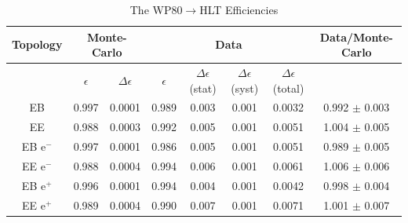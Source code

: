 \begin{table}
  \begin{center}
    \caption{The WP80$\to$HLT Efficiencies}
    \label{tab:wp80HltResults}
    \vskip 2mm
    \begin{tabular}{c|cc|cccc|c}\hline \hline
      Topology &   \multicolumn{2}{c|}{Monte-Carlo} & \multicolumn{4}{c|}{Data} & Data/Monte-Carlo  \\ \hline
               &   $\epsilon$ &  $\Delta\epsilon$  & $\epsilon$ & $\Delta\epsilon$ (stat) & $\Delta\epsilon$ (syst) & $\Delta\epsilon$ (total) &  \\ \hline
      EB       &   0.997     & 0.0001             & 0.989     & 0.003                  & 0.001                  & 0.0032                   & 0.992 $\pm$ 0.003 \\
      EE       &   0.988     & 0.0003             & 0.992     & 0.005                  & 0.001                  & 0.0051                   & 1.004 $\pm$ 0.005 \\
   EB e$^{-}$  &   0.997     & 0.0001             & 0.986     & 0.005                  & 0.001                  & 0.0051                   & 0.989 $\pm$ 0.005 \\
   EE e$^{-}$  &   0.988     & 0.0004             & 0.994     & 0.006                  & 0.001                  & 0.0061                   & 1.006 $\pm$ 0.006 \\
   EB e$^{+}$  &   0.996     & 0.0001             & 0.994     & 0.004                  & 0.001                  & 0.0042                   & 0.998 $\pm$ 0.004 \\
   EE e$^{+}$  &   0.989     & 0.0004             & 0.990     & 0.007                  & 0.001                  & 0.0071                   & 1.001 $\pm$ 0.007 \\ \hline
    \end{tabular}
  \end{center}
\end{table}



